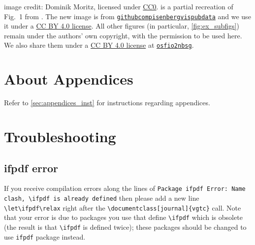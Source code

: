 \documentclass[journal]{vgtc}                     %
\begin{document}
 image credit: Dominik Moritz, licensed under \href{https://creativecommons.org/public-domain/cc0/}{CC0}.
 is a partial recreation of Fig.\ 1 from \cite{Isenberg2017Vispubdata.orgMetadataCollection}. The new image is from \href{https://github.com/pisenberg/vispubdata/}{\texttt{githubcom\discretionary{/}{}{/}pisenberg\discretionary{/}{}{/}vispubdata}} and we use it under a \href{https://creativecommons.org/licenses/by/4.0/}{\ccby{} CC BY 4.0 license}. All other figures (in particular, \cref{fig:ex_subfigs}) remain under the authors' own copyright, with the permission to be used here. We also share them under a \href{https://creativecommons.org/licenses/by/4.0/}{\ccby{} CC BY 4.0 license} at \href{https://doi.org/10.17605/OSF.IO/2NBSG}{\texttt{osfio\discretionary{/}{}{/}2nbsg}}.





%
%
%




\appendix %
{} %

\section{About Appendices}
Refer to \cref{sec:appendices_inst} for instructions regarding appendices.

\section{Troubleshooting}
\label{appendix:troubleshooting}

\subsection{ifpdf error}

If you receive compilation errors along the lines of \texttt{Package ifpdf Error: Name clash, \textbackslash ifpdf is already defined} then please add a new line \verb|\let\ifpdf\relax| right after the \verb|\documentclass[journal]{vgtc}| call.
Note that your error is due to packages you use that define \verb|\ifpdf| which is obsolete (the result is that \verb|\ifpdf| is defined twice); these packages should be changed to use \verb|ifpdf| package instead.
\end{document}
